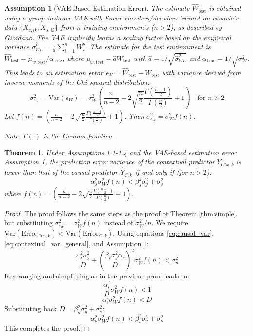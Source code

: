 \documentclass[11pt]{article}
\newtheorem{theorem}{Theorem}[section]
\newtheorem{assumption}{Assumption}[section]
\newcommand{\Var}{\mathrm{Var}}
\begin{document}
\begin{assumption}[VAE-Based Estimation Error]
The estimate $\hat{W}_{\text{test}}$ is obtained using a group-instance VAE with linear encoders/decoders trained on covariate data $\{X_{c,ik}, X_{s,ik}\}$ from $n$ training environments ($n>2$), as described by Giordano. The VAE implicitly learns a scaling factor based on the empirical variance $\hat{\sigma}_{Wn}^2 = \frac{1}{n}\sum_{i=1}^n W_i^2$. The estimate for the test environment is $\hat{W}_{\text{test}} = \mu_{w,\text{test}} / \alpha_{\text{true}}$, where $\mu_{w,\text{test}} = \hat{a} W_{\text{test}}$ with $\hat{a}=1/\sqrt{\hat{\sigma}_{Wn}^2}$ and $\alpha_{\text{true}}=1/\sqrt{\sigma_W^2}$. This leads to an estimation error $\epsilon_W = \hat{W}_{\text{test}} - W_{\text{test}}$ with variance derived from inverse moments of the Chi-squared distribution:
\[ \sigma_{\epsilon_W}^2 = \Var(\epsilon_W) = \sigma_W^2 \left( \frac{n}{n-2} - 2 \sqrt{\frac{n}{2}} \frac{\Gamma(\frac{n-1}{2})}{\Gamma(\frac{n}{2})} + 1 \right) \quad \text{for } n > 2 \]
Let $f(n) = \left( \frac{n}{n-2} - 2 \sqrt{\frac{n}{2}} \frac{\Gamma(\frac{n-1}{2})}{\Gamma(\frac{n}{2})} + 1 \right)$. Then $\sigma_{\epsilon_W}^2 = \sigma_W^2 f(n)$.
\label{ass:vae_error}
\end{assumption}
\textit{Note: $\Gamma(\cdot)$ is the Gamma function.}

\begin{theorem}
Under Assumptions 1.1-1.4 and the VAE-based estimation error Assumption \ref{ass:vae_error}, the prediction error variance of the contextual predictor $\hat{Y}_{Ctx,k}$ is lower than that of the causal predictor $\hat{Y}_{C,k}$ if and only if (for $n>2$):
\[ \alpha_s^2 \sigma_W^2 f(n) < \beta_s^2 \sigma_y^2 + \sigma_s^2 \]
where $f(n) = \left( \frac{n}{n-2} - 2 \sqrt{\frac{n}{2}} \frac{\Gamma(\frac{n-1}{2})}{\Gamma(\frac{n}{2})} + 1 \right)$.
\label{thm:vae}
\end{theorem}

\begin{proof}
The proof follows the same steps as the proof of Theorem \ref{thm:simple}, but substituting $\sigma_{\epsilon_W}^2 = \sigma_W^2 f(n)$ instead of $\sigma_W^2/n$.
We require $\Var(\text{Error}_{Ctx,k}) < \Var(\text{Error}_{C,k})$. Using equations \eqref{eq:causal_var}, \eqref{eq:contextual_var_general}, and Assumption \ref{ass:vae_error}:
\[ \frac{\sigma_s^2 \sigma_y^2}{D} + \left(\frac{\beta_s \sigma_y^2 \alpha_s}{D}\right)^2 \sigma_W^2 f(n) < \sigma_y^2 \]
Rearranging and simplifying as in the previous proof leads to:
\[ \frac{\alpha_s^2}{D} \sigma_W^2 f(n) < 1 \]
\[ \alpha_s^2 \sigma_W^2 f(n) < D \]
Substituting back $D = \beta_s^2 \sigma_y^2 + \sigma_s^2$:
\[ \alpha_s^2 \sigma_W^2 f(n) < \beta_s^2 \sigma_y^2 + \sigma_s^2 \]
This completes the proof.
\end{proof}
\end{document}
